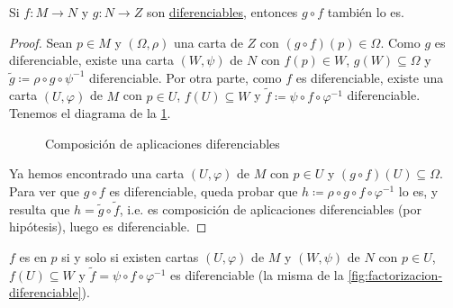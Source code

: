 \documentclass[../VD.tex]{subfiles}
\begin{document}
\begin{lemma}
  Si \(f \colon M \to N\) y \(g \colon N \to Z\) son
  \hyperref[def:diferenciable]{diferenciables}, entonces \(g \circ f\) también
  lo es.
\end{lemma}

\begin{proof}
  Sean \(p \in M\) y \((\Omega,\rho)\) una carta de \(Z\) con \((g \circ f)(p)
  \in \Omega\). Como \(g\) es diferenciable, existe una carta \((W,\psi)\) de
  \(N\) con \(f(p) \in W\), \(g(W) \subseteq \Omega\) y \(\widetilde{g}
  \coloneqq \rho \circ g \circ \psi^{-1}\) diferenciable. Por otra parte, como
  \(f\) es diferenciable, existe una carta \((U,\varphi)\) de \(M\) con \(p \in
  U\), \(f(U) \subseteq W\) y \(\widetilde{f} \coloneqq \psi \circ f \circ
  \varphi^{-1}\) diferenciable. Tenemos el diagrama de la \cref{fig:comp-dif-cd}.

  \begin{figure}[h]
    \centering
    \caption{Composición de aplicaciones diferenciables}
    \label{fig:comp-dif-cd}
  \end{figure}

  Ya hemos encontrado una carta \((U,\varphi)\) de \(M\) con \(p \in U\) y \((g
  \circ f)(U) \subseteq \Omega\).
  Para ver que \(g \circ f\) es diferenciable, queda probar que
  \(h \coloneqq \rho \circ g \circ f \circ \varphi^{-1}\) lo es, y resulta que
  \(h = \widetilde{g} \circ \widetilde{f}\), i.e. es composición de aplicaciones
  diferenciables (por hipótesis), luego es diferenciable.
\end{proof}

\begin{lemma}
  \label{lem:dif-caract-exists}
  \(f\) es  en \(p\) si y solo si existen cartas
  \((U,\varphi)\) de \(M\) y \((W,\psi)\) de \(N\) con \(p \in U\), \(f(U)
  \subseteq W\) y \(\widetilde{f} = \psi \circ f \circ \varphi^{-1}\) es
  diferenciable (la misma de la \cref{fig:factorizacion-diferenciable}).
\end{lemma}
\end{document}
